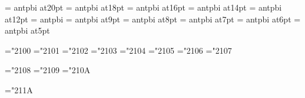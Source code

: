 \font\twentyslbf=      antpbi at20pt
\font\eighteenslbf=    antpbi at18pt
\font\sixteenslbf=     antpbi at16pt
\font\fourteenslbf=    antpbi at14pt
\font\twelveslbf=      antpbi at12pt
\font\slbf=            antpbi
\font\nineslbf=        antpbi at9pt
\font\eightslbf=       antpbi at8pt
\font\sevenslbf=       antpbi at7pt
\font\sixslbf=         antpbi at6pt
\font\fiveslbf=        antpbi at5pt

%
%
\mathchardef\Gamma="2100
\mathchardef\Delta="2101
\mathchardef\Theta="2102
\mathchardef\Lambda="2103
\mathchardef\Xi="2104
\mathchardef\Pi="2105
\mathchardef\Sigma="2106
\mathchardef\Upsilon="2107

\mathchardef\Phi="2108
\mathchardef\Psi="2109
\mathchardef\Omega="210A

\mathchardef\varrho="211A

%
\rm 